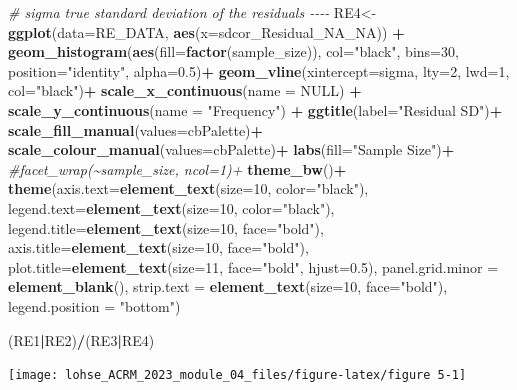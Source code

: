 \documentclass[
]{article}
\newenvironment{Shaded}{\begin{snugshade}}{\end{snugshade}}
\newcommand{\AttributeTok}[1]{\textcolor[rgb]{0.13,0.29,0.53}{#1}}
\newcommand{\CommentTok}[1]{\textcolor[rgb]{0.56,0.35,0.01}{\textit{#1}}}
\newcommand{\ConstantTok}[1]{\textcolor[rgb]{0.56,0.35,0.01}{#1}}
\newcommand{\DecValTok}[1]{\textcolor[rgb]{0.00,0.00,0.81}{#1}}
\newcommand{\FloatTok}[1]{\textcolor[rgb]{0.00,0.00,0.81}{#1}}
\newcommand{\FunctionTok}[1]{\textcolor[rgb]{0.13,0.29,0.53}{\textbf{#1}}}
\newcommand{\NormalTok}[1]{#1}
\newcommand{\OtherTok}[1]{\textcolor[rgb]{0.56,0.35,0.01}{#1}}
\newcommand{\SpecialCharTok}[1]{\textcolor[rgb]{0.81,0.36,0.00}{\textbf{#1}}}
\newcommand{\StringTok}[1]{\textcolor[rgb]{0.31,0.60,0.02}{#1}}
\begin{document}
\begin{Shaded}
\begin{Highlighting}[]
\CommentTok{\# sigma true standard deviation of the residuals {-}{-}{-}{-}}
\NormalTok{RE4}\OtherTok{\textless{}{-}}\FunctionTok{ggplot}\NormalTok{(}\AttributeTok{data=}\NormalTok{RE\_DATA, }\FunctionTok{aes}\NormalTok{(}\AttributeTok{x=}\NormalTok{sdcor\_Residual\_NA\_NA)) }\SpecialCharTok{+}
  \FunctionTok{geom\_histogram}\NormalTok{(}\FunctionTok{aes}\NormalTok{(}\AttributeTok{fill=}\FunctionTok{factor}\NormalTok{(sample\_size)), }\AttributeTok{col=}\StringTok{"black"}\NormalTok{, }\AttributeTok{bins=}\DecValTok{30}\NormalTok{,}
                 \AttributeTok{position=}\StringTok{"identity"}\NormalTok{, }\AttributeTok{alpha=}\FloatTok{0.5}\NormalTok{)}\SpecialCharTok{+}
  \FunctionTok{geom\_vline}\NormalTok{(}\AttributeTok{xintercept=}\NormalTok{sigma, }\AttributeTok{lty=}\DecValTok{2}\NormalTok{, }\AttributeTok{lwd=}\DecValTok{1}\NormalTok{, }\AttributeTok{col=}\StringTok{"black"}\NormalTok{)}\SpecialCharTok{+}
  \FunctionTok{scale\_x\_continuous}\NormalTok{(}\AttributeTok{name =} \ConstantTok{NULL}\NormalTok{) }\SpecialCharTok{+}
  \FunctionTok{scale\_y\_continuous}\NormalTok{(}\AttributeTok{name =} \StringTok{"Frequency"}\NormalTok{) }\SpecialCharTok{+}
  \FunctionTok{ggtitle}\NormalTok{(}\AttributeTok{label=}\StringTok{"Residual SD"}\NormalTok{)}\SpecialCharTok{+}
  \FunctionTok{scale\_fill\_manual}\NormalTok{(}\AttributeTok{values=}\NormalTok{cbPalette)}\SpecialCharTok{+}
  \FunctionTok{scale\_colour\_manual}\NormalTok{(}\AttributeTok{values=}\NormalTok{cbPalette)}\SpecialCharTok{+}
  \FunctionTok{labs}\NormalTok{(}\AttributeTok{fill=}\StringTok{"Sample Size"}\NormalTok{)}\SpecialCharTok{+}
  \CommentTok{\#facet\_wrap(\textasciitilde{}sample\_size, ncol=1)+}
  \FunctionTok{theme\_bw}\NormalTok{()}\SpecialCharTok{+}
  \FunctionTok{theme}\NormalTok{(}\AttributeTok{axis.text=}\FunctionTok{element\_text}\NormalTok{(}\AttributeTok{size=}\DecValTok{10}\NormalTok{, }\AttributeTok{color=}\StringTok{"black"}\NormalTok{),}
        \AttributeTok{legend.text=}\FunctionTok{element\_text}\NormalTok{(}\AttributeTok{size=}\DecValTok{10}\NormalTok{, }\AttributeTok{color=}\StringTok{"black"}\NormalTok{),}
        \AttributeTok{legend.title=}\FunctionTok{element\_text}\NormalTok{(}\AttributeTok{size=}\DecValTok{10}\NormalTok{, }\AttributeTok{face=}\StringTok{"bold"}\NormalTok{),}
        \AttributeTok{axis.title=}\FunctionTok{element\_text}\NormalTok{(}\AttributeTok{size=}\DecValTok{10}\NormalTok{, }\AttributeTok{face=}\StringTok{"bold"}\NormalTok{),}
        \AttributeTok{plot.title=}\FunctionTok{element\_text}\NormalTok{(}\AttributeTok{size=}\DecValTok{11}\NormalTok{, }\AttributeTok{face=}\StringTok{"bold"}\NormalTok{, }\AttributeTok{hjust=}\FloatTok{0.5}\NormalTok{),}
        \AttributeTok{panel.grid.minor =} \FunctionTok{element\_blank}\NormalTok{(),}
        \AttributeTok{strip.text =} \FunctionTok{element\_text}\NormalTok{(}\AttributeTok{size=}\DecValTok{10}\NormalTok{, }\AttributeTok{face=}\StringTok{"bold"}\NormalTok{),}
        \AttributeTok{legend.position =} \StringTok{"bottom"}\NormalTok{)}

\NormalTok{(RE1}\SpecialCharTok{|}\NormalTok{RE2)}\SpecialCharTok{/}\NormalTok{(RE3}\SpecialCharTok{|}\NormalTok{RE4)}
\end{Highlighting}
\end{Shaded}

\begin{center}\texttt{[image: lohse\_ACRM\_2023\_module\_04\_files/figure-latex/figure 5-1]} \end{center}
\end{document}
